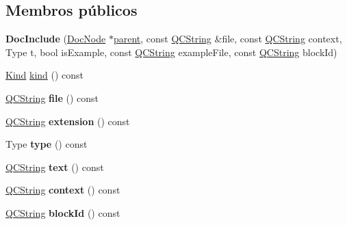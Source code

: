 \subsection*{Membros públicos}
\begin{DoxyCompactItemize}
\item 
\hypertarget{class_doc_include_afef0700c8e7aefc2aab69622288d7923}{{\bfseries Doc\-Include} (\hyperlink{class_doc_node}{Doc\-Node} $\ast$\hyperlink{class_doc_node_abd7f070d6b0a38b4da71c2806578d19d}{parent}, const \hyperlink{class_q_c_string}{Q\-C\-String} \&file, const \hyperlink{class_q_c_string}{Q\-C\-String} context, Type t, bool is\-Example, const \hyperlink{class_q_c_string}{Q\-C\-String} example\-File, const \hyperlink{class_q_c_string}{Q\-C\-String} block\-Id)}\label{class_doc_include_afef0700c8e7aefc2aab69622288d7923}

\item 
\hyperlink{class_doc_node_aa10c9e8951b8ccf714a59ec321bdac5b}{Kind} \hyperlink{class_doc_include_aa9d037bed9f9a083d0cd01485637d843}{kind} () const 
\item 
\hypertarget{class_doc_include_aeaa8cdb0fbabc1058b7d3813f2fd223b}{\hyperlink{class_q_c_string}{Q\-C\-String} {\bfseries file} () const }\label{class_doc_include_aeaa8cdb0fbabc1058b7d3813f2fd223b}

\item 
\hypertarget{class_doc_include_a51ab61cd9213c69a0eff943ab5f8ce7f}{\hyperlink{class_q_c_string}{Q\-C\-String} {\bfseries extension} () const }\label{class_doc_include_a51ab61cd9213c69a0eff943ab5f8ce7f}

\item 
\hypertarget{class_doc_include_afbd0fa31db28593e9669c3c56711c0a7}{Type {\bfseries type} () const }\label{class_doc_include_afbd0fa31db28593e9669c3c56711c0a7}

\item 
\hypertarget{class_doc_include_a367883e6ba4151924745ee021c01b5e7}{\hyperlink{class_q_c_string}{Q\-C\-String} {\bfseries text} () const }\label{class_doc_include_a367883e6ba4151924745ee021c01b5e7}

\item 
\hypertarget{class_doc_include_a4d6bb4ed13678cf22ef5cb414076d9f5}{\hyperlink{class_q_c_string}{Q\-C\-String} {\bfseries context} () const }\label{class_doc_include_a4d6bb4ed13678cf22ef5cb414076d9f5}

\item 
\hypertarget{class_doc_include_a98277f3ec4789b7b1914c0cfc17d90fa}{\hyperlink{class_q_c_string}{Q\-C\-String} {\bfseries block\-Id} () const }\label{class_doc_include_a98277f3ec4789b7b1914c0cfc17d90fa}


\end{DoxyCompactItemize}
